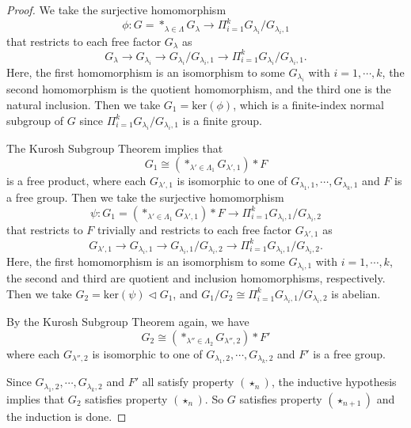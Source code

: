 \documentclass{amsart}
\numberwithin{equation}{section}
\theoremstyle{definition}
\begin{document}
\begin{proof}
We take the surjective homomorphism 
$$\phi:G=*_{\lambda\in \Lambda}G_{\lambda}\to \Pi_{i=1}^k G_{\lambda_i}/G_{\lambda_i,1}$$
that restricts to each free factor $G_{\lambda}$ as 
$$G_{\lambda}\to G_{\lambda_i}\to G_{\lambda_i}/G_{\lambda_i,1}\to \Pi_{i=1}^k G_{\lambda_i}/G_{\lambda_i,1}.$$
Here, the first homomorphism is an isomorphism to some $G_{\lambda_i}$ with $i=1,\cdots,k$, the second homomorphism is the quotient homomorphism, and the third one is the natural inclusion. Then we take $G_1=\text{ker}(\phi)$, which is a finite-index normal subgroup of $G$ since $\Pi_{i=1}^k G_{\lambda_i}/G_{\lambda_i,1}$ is a finite group. 

The Kurosh Subgroup Theorem implies that 
$$G_1\cong (*_{\lambda'\in \Lambda_1}G_{\lambda',1})*F$$ is a free product, where each $G_{\lambda',1}$ is isomorphic to one of $G_{\lambda_1,1},\cdots, G_{\lambda_k,1}$ and $F$ is a free group.
Then we take the surjective homomorphism 
$$\psi:G_1= (*_{\lambda'\in \Lambda_1}G_{\lambda',1})*F\to \Pi_{i=1}^k G_{\lambda_i,1}/G_{\lambda_i,2}$$
that restricts to $F$ trivially and restricts to each free factor $G_{\lambda',1}$ as 
$$G_{\lambda',1}\to G_{\lambda_i,1}\to G_{\lambda_i,1}/G_{\lambda_i,2}\to \Pi_{i=1}^k G_{\lambda_i,1}/G_{\lambda_i,2}.$$
Here, the first homomorphism is an isomorphism to some $G_{\lambda_i,1}$ with $i=1,\cdots,k$, the second and third are quotient and inclusion homomorphisms, respectively. Then we take $G_2=\text{ker}(\psi)\vartriangleleft G_1$, and $G_1/G_2\cong\Pi_{i=1}^k G_{\lambda_i,1}/G_{\lambda_i,2}$ is abelian. 

By the Kurosh Subgroup Theorem again, we have $$G_2\cong (*_{\lambda''\in \Lambda_2}G_{\lambda'',2})*F'$$
where each $G_{\lambda'',2}$ is isomorphic to one of $G_{\lambda_1,2},\cdots, G_{\lambda_k,2}$ and $F'$ is a free group. 

Since $G_{\lambda_1,2},\cdots, G_{\lambda_k,2}$ and $F'$ all satisfy property $(\star_n)$, the inductive hypothesis implies that $G_2$ satisfies property $(\star_n)$. So $G$ satisfies property $(\star_{n+1})$ and the induction is done.
\end{proof}
\end{document}
